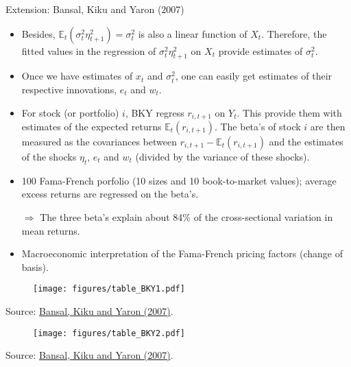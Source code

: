 \begin{frame}{Extension: Bansal, Kiku and Yaron (2007)}
\begin{footnotesize}
\begin{itemize}
	\item Besides, $\mathbb{E}_t(\sigma_t^2 \eta_{t+1}^2)=\sigma_t^2$ is also a linear function of $X_t$. Therefore, the fitted values in the regression of $\sigma_t^2 \eta_{t+1}^2$ on $X_t$ provide estimates of $\sigma_t^2$.
	\item Once we have estimates of $x_t$ and $\sigma^2_t$, one can easily get estimates of their respective innovations, $e_t$ and $w_t$.
	\item For stock (or portfolio) $i$, BKY regress $r_{i,t+1}$ on $Y_t$. This provide them with estimates of the expected returns $\mathbb{E}_t(r_{i,t+1})$. The beta's of stock $i$ are then measured as the covariances between $r_{i,t+1}-\mathbb{E}_t(r_{i,t+1})$ and the estimates of the shocks $\eta_t$, $e_t$ and $w_t$ (divided by the variance of these shocks).
	\item 100 Fama-French porfolio (10 sizes and 10 book-to-market values); average excess returns are regressed on the beta's.
	\item[$\Rightarrow$] The three beta's explain about 84\% of the cross-sectional variation in mean returns.
	\item Macroeconomic interpretation of the Fama-French pricing factors (change of basis).
\end{itemize}
\end{footnotesize}
\end{frame}

\begin{frame}
\begin{scriptsize}
		\begin{figure}
			\texttt{[image: figures/table\_BKY1.pdf]}
		\end{figure}
		\begin{tiny}
		\begin{center}
		Source: \href{https://faculty.fuqua.duke.edu/~rb7/bio/BKY_09252007.pdf}{Bansal, Kiku and Yaron (2007)}.
		\end{center}
		\end{tiny}
\end{scriptsize}
\end{frame}

\begin{frame}
\begin{scriptsize}
		\begin{figure}
			\texttt{[image: figures/table\_BKY2.pdf]}
		\end{figure}
		\begin{tiny}
		\begin{center}
		Source: \href{https://faculty.fuqua.duke.edu/~rb7/bio/BKY_09252007.pdf}{Bansal, Kiku and Yaron (2007)}.
		\end{center}
		\end{tiny}
\end{scriptsize}
\end{frame}






